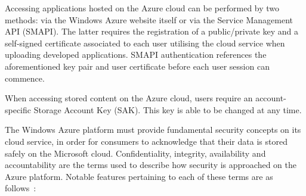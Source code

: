Accessing applications hosted on the Azure cloud can be performed by two methods: via the Windows Azure website itself or via the Service Management API (SMAPI). The latter requires the registration of a public/private key and a self-signed certificate associated to each user utilising the cloud service when uploading developed applications. SMAPI authentication references the aforementioned key pair and user certificate before each user session can commence.

When accessing stored content on the Azure cloud, users require an account-specific Storage Account Key (SAK). This key is able to be changed at any time.

The Windows Azure platform must provide fundamental security concepts on its cloud service, in order for consumers to acknowledge that their data is stored safely on the Microsoft cloud. Confidentiality, integrity, availability and accountability are the terms used to describe how security is approached on the Azure platform. Notable features pertaining to each of these terms are as follows~\cite{AzureSecurity}:

